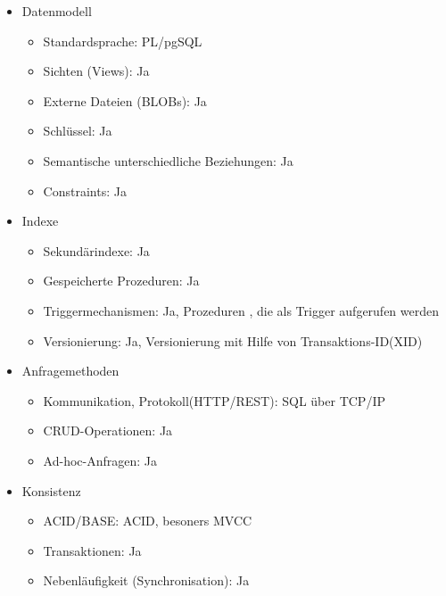 \begin{itemize}
        \item Datenmodell
        \begin{itemize}
            \item Standardsprache: PL/pgSQL %
            \item Sichten (Views): Ja
            \item Externe Dateien (BLOBs): Ja
            \item Schlüssel: Ja
            \item Semantische unterschiedliche Beziehungen: Ja
            \item Constraints: Ja
        \end{itemize}
        \item Indexe
        \begin{itemize}
            \item Sekundärindexe: Ja
            \item Gespeicherte Prozeduren: Ja
            \item Triggermechanismen: Ja, Prozeduren , die als Trigger aufgerufen werden %
            \item Versionierung: Ja, Versionierung mit Hilfe von Transaktions-ID(XID) %
        \end{itemize}
        \item Anfragemethoden
        \begin{itemize}
            \item Kommunikation, Protokoll(HTTP/REST): SQL über TCP/IP
            \item CRUD-Operationen: Ja
            \item Ad-hoc-Anfragen: Ja
        \end{itemize}
        \item Konsistenz
        \begin{itemize}
            \item ACID/BASE: ACID, besoners MVCC
            \item Transaktionen: Ja
            \item Nebenläufigkeit (Synchronisation): Ja

\end{itemize}
\end{itemize}
